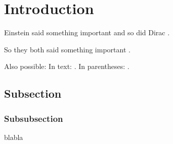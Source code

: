 \section{Introduction}




Einstein said something important \cite{einstein} and so did Dirac \cite{dirac}.

So they both said something important \cite{dirac,einstein}.

Also possible: In text: \citet{dirac}. In parentheses: \citep{dirac}.


\subsection{Subsection}
\subsubsection{Subsubsection}

blabla